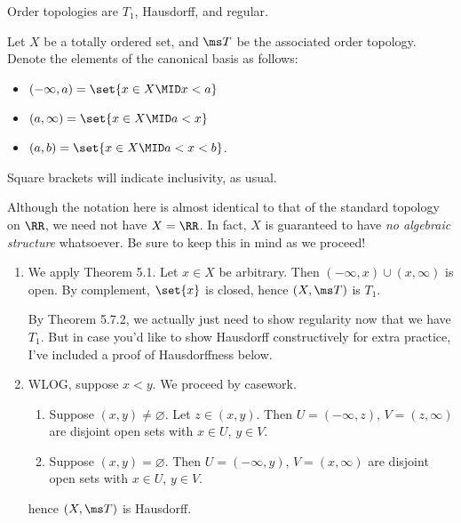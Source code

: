 \documentclass{fkpset}
\begin{document}
  \begin{problem}[5.15]
    Order topologies are $T_1$, Hausdorff, and regular.
  \end{problem}
  \begin{solution}
    Let $X$ be a totally ordered set, and $\ms T$ be the associated
    order topology. Denote the elements of the canonical basis as
    follows:
    \begin{itemize}
      \item $(-\infty, a) = \set{x \in X \MID x < a}$
      \item $(a, \infty) = \set{x \in X \MID a < x}$
      \item $(a,b) = \set{x \in X \MID a < x < b}$.
    \end{itemize}
    Square brackets will indicate inclusivity, as usual.
    \begin{note}
      \color{red} Although the notation here is almost identical to
      that of the standard topology on $\RR$, we need not have $X =
      \RR$. In fact, $X$ is guaranteed to have \emph{no algebraic
        structure} whatsoever. Be sure to keep this in mind as we
      proceed!
    \end{note}

    \begin{enumerate}[label=(\arabic*)]
      \item We apply Theorem 5.1. Let $x \in X$ be arbitrary. Then
        $(-\infty, x) \cup (x, \infty)$ is open. By complement,
        $\set{x}$ is closed, hence $(X,\ms T)$ is $T_1$.
        \begin{remark}
          {\color{red} By Theorem 5.7.2, we actually just need to show
            regularity now that we have $T_1$. But in case you'd like
            to show Hausdorff constructively for extra practice, I've
            included a proof of Hausdorffness below.}
        \end{remark}
      \item WLOG, suppose $x < y$. We proceed by casework.
        \begin{enumerate}[label=(\roman*)]
          \item Suppose $(x,y) \neq \varnothing$. Let $z \in (x,y)$.
            Then $U = (-\infty, z)$, $V = (z, \infty)$ are disjoint
            open sets with $x \in U$, $y \in V$.
          \item Suppose $(x,y) = \varnothing$. Then $U = (-\infty,
            y)$, $V = (x, \infty)$ are disjoint open sets with $x \in
            U$, $y \in V$.
        \end{enumerate}
        hence $(X, \ms T)$ is Hausdorff.
        \begin{figure}[H]
          \centering
\end{figure}
\end{enumerate}
\end{solution}
\end{document}
